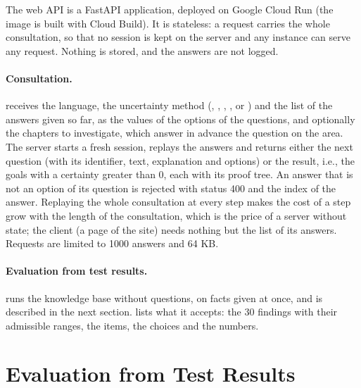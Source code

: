 The web API is a FastAPI application, deployed on Google Cloud Run (the image is
built with Cloud Build). It is stateless: a request carries the whole
consultation, so that no session is kept on the server and any instance can
serve any request. Nothing is stored, and the answers are not logged.

\paragraph{Consultation.}
 receives the language, the uncertainty method (,
, , ,  or
) and the list of the answers given so far, as the values of the
options of the questions, and optionally the chapters to investigate, which
answer in advance the question on the area. The server starts a fresh session, replays the
answers and returns either the next question (with its identifier, text,
explanation and options) or the result, i.e., the goals with a certainty
greater than $0$, each with its proof tree. An answer that is not an option of
its question is rejected with status 400 and the index of the answer. Replaying
the whole consultation at every step makes the cost of a step grow with the
length of the consultation, which is the price of a server without state; the
client (a page of the site) needs nothing but the list of its answers. Requests are limited to
1000 answers and 64 KB.

\paragraph{Evaluation from test results.}
 runs the knowledge base without questions, on facts given
at once, and is described in the next section.  lists what
it accepts: the 30 findings with their admissible ranges, the items, the choices
and the numbers.

\section{Evaluation from Test Results}
\label{sec:evaluate}

